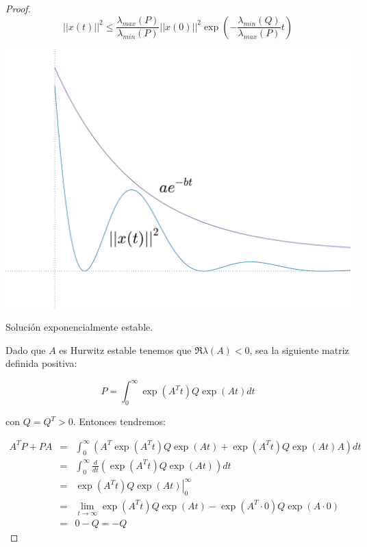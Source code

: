 \begin{proof}
            \begin{equation*}
                ||x(t)||^2 \le \frac{\lambda_{max}(P)}{\lambda_{min}(P)} ||x(0)||^2 \exp{\left( - \frac{\lambda_{min}(Q)}{\lambda_{max}(P)} t \right)}
            \end{equation*}

            \begin{marginfigure}
                \centering
                \includegraphics[width=\textwidth]{./imagenes/trayectoria.pdf}
                \caption{\label{fig:trayectoria}Solución exponencialmente estable.}
            \end{marginfigure}

            Dado que $A$ es Hurwitz estable tenemos que $\Re{\lambda(A)} < 0$, sea la siguiente matriz definida positiva:

            \begin{equation*}
                P = \int_0^{\infty} \exp{(A^Tt)} Q \exp(At) dt
            \end{equation*}

            con $Q = Q^T > 0$. Entonces tendremos:

            \begin{eqnarray*}
                A^T P + P A & = & \int_0^{\infty} \left( A^T \exp{(A^T t)} Q \exp{(At)} + \exp{(A^T t)} Q \exp{(At)} A \right) dt \\
                & = & \int_0^{\infty} \frac{d}{dt} \left( \exp{(A^T t)} Q \exp{(At)} \right) dt \\
                & = & \left. \exp{(A^T t)} Q \exp{(At)} \right|_0^{\infty} \\
                & = & \lim_{t \to \infty} \exp{(A^T t)} Q \exp{(At)} - \exp{(A^T \cdot 0)} Q \exp{(A \cdot 0)} \\
                & = & 0 - Q = - Q
            \end{eqnarray*}
        \end{proof}

